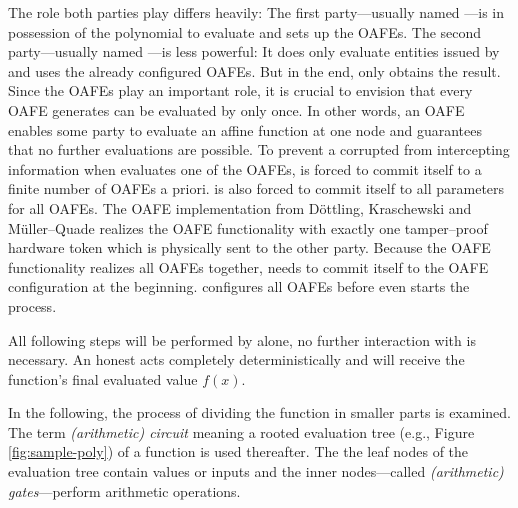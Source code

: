 The role both parties play differs heavily: The first party---usually named
\JWpOne{}---is in possession of the polynomial to evaluate and sets up the
OAFEs.  The second party---usually named \JWpTwo{}---is less powerful: It does
only evaluate entities issued by \JWpOne{} and uses the already configured
OAFEs. But in the end, only \JWpTwo{} obtains the result.  Since the OAFEs play
an important role, it is crucial to envision that every OAFE \JWpOne{} generates
can be evaluated by \JWpTwo{} only once. In other words, an OAFE enables some
party to evaluate an affine function at one node and guarantees that no further
evaluations are possible. To prevent a corrupted \JWpOne{} from intercepting
information when \JWpTwo{} evaluates one of the OAFEs, \JWpOne{} is forced to
commit itself to a finite number of OAFEs a priori. \JWpOne{} is also forced to
commit itself to all parameters for all OAFEs. The OAFE implementation from
Döttling, Kraschewski and Müller--Quade \cite{davidgoliath} realizes the OAFE
functionality with exactly one tamper--proof hardware token which is
physically sent to the other party. Because the OAFE functionality realizes all
OAFEs together, \JWpOne{} needs to commit itself to the OAFE configuration at
the beginning. \JWpOne{} configures all OAFEs before \JWpTwo{} even starts the
process.

All following steps will be performed by \JWpTwo{} alone, no further interaction
with \JWpOne{} is necessary. An honest \JWpTwo{} acts completely
deterministically and will receive the function's final evaluated value $f(x)$.

In the following, the process of dividing the function in smaller parts is
examined. The term \emph{(arithmetic) circuit} meaning a rooted evaluation tree
(e.g., Figure \ref{fig:sample-poly}) of a function is used thereafter. The the
leaf nodes of the evaluation tree contain values or inputs and the inner
nodes---called \emph{(arithmetic) gates}---perform arithmetic operations.

